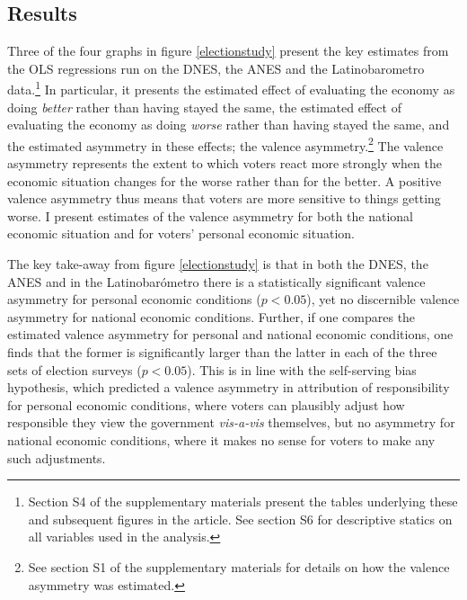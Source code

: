 \documentclass[a4paper,11pt]{article}
\begin{document}
	\subsection*{Results}
	Three of the four graphs in figure \ref{electionstudy} present the key estimates from the OLS regressions run on the DNES, the ANES and the Latinobarometro data.\footnote{Section S4 of the supplementary materials present the tables underlying these and subsequent figures in the article. See section S6 for descriptive statics on all variables used in the analysis.} In particular, it presents the estimated effect of evaluating the economy as doing \textit{better} rather than having stayed the same, the estimated effect of evaluating the economy as doing \textit{worse} rather than having stayed the same, and the estimated asymmetry in these effects; the valence asymmetry.\footnote{See section S1 of the supplementary materials for details on how the valence asymmetry was estimated.} The valence asymmetry represents the extent to which voters react more strongly when the economic situation changes for the worse rather than for the better. A positive valence asymmetry thus means that voters are more sensitive to things getting worse. I present estimates of the valence asymmetry for both the national economic situation and for voters' personal economic situation.
	
	The key take-away from figure \ref{electionstudy} is that in both the DNES, the ANES and in the Latinobarómetro there is a statistically significant valence asymmetry for personal economic conditions ($p<0.05$), yet no discernible valence asymmetry for national economic conditions. Further, if one compares the estimated valence asymmetry for personal and national economic conditions, one finds that the former is significantly larger than the latter in each of the three sets of election surveys ($p<0.05$). This is in line with the self-serving bias hypothesis, which predicted a valence asymmetry in attribution of responsibility for personal economic conditions, where voters can plausibly adjust how responsible they view the government \textit{vis-a-vis} themselves, but no asymmetry for national economic conditions, where it makes no sense for voters to make any such adjustments.
	
\end{document}
